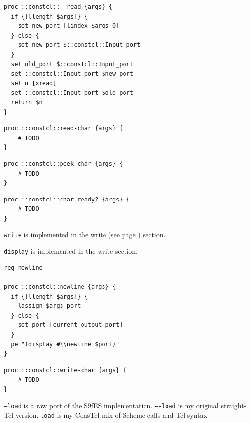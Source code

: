 \documentclass[twoside,9pt]{report}
\begin{document}
\noindent\makebox[\linewidth]{\rule{\linewidth}{0.4pt}}
\begin{lstlisting}
proc ::constcl::--read {args} {
  if {[llength $args]} {
    set new_port [lindex $args 0]
  } else {
    set new_port $::constcl::Input_port
  }
  set old_port $::constcl::Input_port
  set ::constcl::Input_port $new_port
  set n [xread]
  set ::constcl::Input_port $old_port
  return $n
}
\end{lstlisting}
\noindent\makebox[\linewidth]{\rule{\linewidth}{0.4pt}}
\noindent\makebox[\linewidth]{\rule{\linewidth}{0.4pt}}
\begin{lstlisting}
proc ::constcl::read-char {args} {
    # TODO
}
\end{lstlisting}
\noindent\makebox[\linewidth]{\rule{\linewidth}{0.4pt}}
\noindent\makebox[\linewidth]{\rule{\linewidth}{0.4pt}}
\begin{lstlisting}
proc ::constcl::peek-char {args} {
    # TODO
}
\end{lstlisting}
\noindent\makebox[\linewidth]{\rule{\linewidth}{0.4pt}}
\noindent\makebox[\linewidth]{\rule{\linewidth}{0.4pt}}
\begin{lstlisting}
proc ::constcl::char-ready? {args} {
    # TODO
}
\end{lstlisting}
\noindent\makebox[\linewidth]{\rule{\linewidth}{0.4pt}}

\texttt{write} is implemented in the write (see page \pageref{write}) section.


\texttt{display} is implemented in the write section.

\noindent\makebox[\linewidth]{\rule{\linewidth}{0.4pt}}
\begin{lstlisting}
reg newline
 
proc ::constcl::newline {args} {
  if {[llength $args]} {
    lassign $args port
  } else {
    set port [current-output-port]
  }
  pe "(display #\\newline $port)"
}
\end{lstlisting}
\noindent\makebox[\linewidth]{\rule{\linewidth}{0.4pt}}
\noindent\makebox[\linewidth]{\rule{\linewidth}{0.4pt}}
\begin{lstlisting}
proc ::constcl::write-char {args} {
    # TODO
}
\end{lstlisting}
\noindent\makebox[\linewidth]{\rule{\linewidth}{0.4pt}}

\texttt{--load} is a raw port of the S9fES implementation. \texttt{----load} is my original straight-Tcl version. \texttt{load} is my ConsTcl mix of Scheme calls and Tcl syntax.
\end{document}
